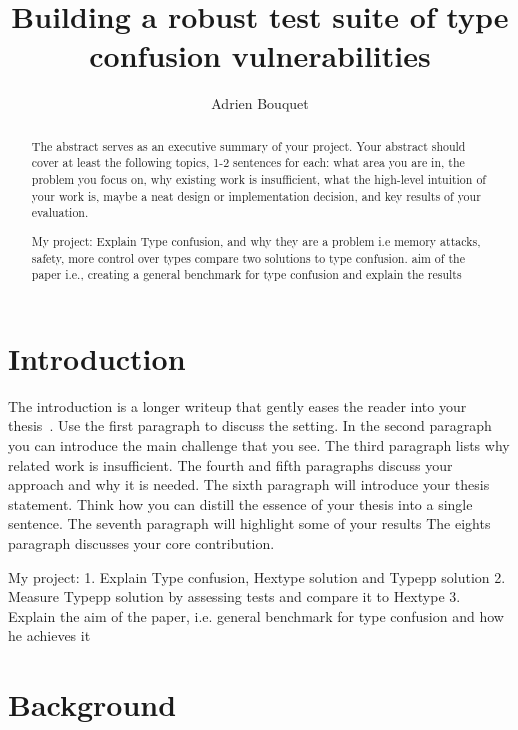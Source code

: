 \documentclass[a4paper,11pt,oneside]{report}
\title{Building a robust test suite of type confusion vulnerabilities}
\author{Adrien Bouquet}
\begin{document}
\maketitle
\makededication
\makeacks

\begin{abstract}

The abstract serves as an executive summary of your project.
Your abstract should cover at least the following topics, 1-2 sentences for
each: what area you are in, the problem you focus on, why existing work is
insufficient, what the high-level intuition of your work is, maybe a neat
design or implementation decision, and key results of your evaluation.

My project: 
Explain Type confusion, and why they are a problem i.e memory attacks, safety, more control over types
compare two solutions to type confusion.
aim of the paper i.e., creating a general benchmark for type confusion and explain the results


\end{abstract}

\maketoc

\chapter{Introduction}

The introduction is a longer writeup that gently eases the reader into your
thesis~\cite{dinesh20oakland}. Use the first paragraph to discuss the setting.
In the second paragraph you can introduce the main challenge that you see.
The third paragraph lists why related work is insufficient.
The fourth and fifth paragraphs discuss your approach and why it is needed.
The sixth paragraph will introduce your thesis statement. Think how you can
distill the essence of your thesis into a single sentence.
The seventh paragraph will highlight some of your results
The eights paragraph discusses your core contribution.

My project: 
1. Explain Type confusion, Hextype solution and Typepp solution
2. Measure Typepp solution by assessing tests and compare it to Hextype
3. Explain the aim of the paper, i.e. general benchmark for type confusion and how he achieves it

\chapter{Background}
\end{document}
